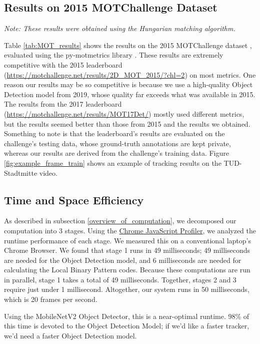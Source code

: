 \documentclass[10pt,twocolumn,letterpaper]{article}
\begin{document}
\subsection{Results on 2015 MOTChallenge Dataset}
\textit{Note: These results were obtained using the Hungarian matching algorithm.}


Table \ref{tab:MOT_results} shows the results on the 2015 MOTChallenge dataset \cite{motchallenge2015}, evaluated using the py-motmetrics library \cite{pymotmetrics}.
These results are extremely competitive with the 2015 leaderboard (\url{https://motchallenge.net/results/2D_MOT_2015/?chl=2}) on most metrics.
One reason our results may be so competitive is because we use a high-quality Object Detection model from 2019, whose quality far exceeds what was available in 2015. 
The results from the 2017 leaderboard (\url{https://motchallenge.net/results/MOT17Det/}) mostly used different metrics, but the results seemed better than those from 2015 and the results we obtained.
Something to note is that the leaderboard's results are evaluated on the challenge's testing data, whose ground-truth annotations are kept private, whereas our results are derived from the challenge's training data.
Figure \ref{fig:example_frame_train} shows an example of tracking results on the TUD-Stadtmitte video.



\label{time_and_space_eff}
\subsection{Time and Space Efficiency}
As described in subsection \ref{overview_of_computation}, we decomposed our computation into 3 stages.
Using the \href{https://developers.google.com/web/updates/2016/12/devtools-javascript-cpu-profile-migration}{Chrome JavaScript Profiler}, we analyzed the runtime performance of each stage.
We measured this on a conventional laptop's Chrome Browser.
We found that stage 1 runs in 49 milliseconds; 49 milliseconds are needed for the Object Detection model, and 6 milliseconds are needed for calculating the Local Binary Pattern codes.
Because these computations are run in parallel, stage 1 takes a total of 49 milliseconds.
Together, stages 2 and 3 require just under 1 millisecond.
Altogether, our system runs in 50 milliseconds, which is 20 frames per second.

Using the MobileNetV2 Object Detector, this is a near-optimal runtime.
98\% of this time is devoted to the Object Detection Model; if we'd like a faster tracker, we'd need a faster Object Detection model.
\end{document}
